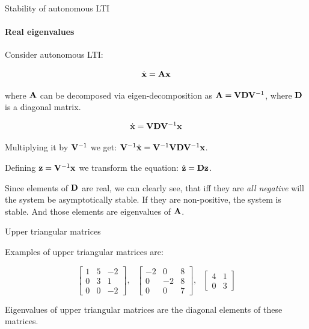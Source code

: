 \documentclass{beamer}
\begin{document}
\begin{frame}{Stability of autonomous LTI}
\framesubtitle{Real eigenvalues}
\begin{flushleft}

Consider autonomous LTI:

\begin{equation}
    \dot{\mathbf{x}} = \mathbf{A} \mathbf{x}
\end{equation}

where $\mathbf{A}$ can be decomposed via eigen-decomposition as $\mathbf{A} = \mathbf{V} \mathbf{D} \mathbf{V}^{-1}$, where $\mathbf{D}$ is a diagonal matrix. 

\bigskip

\begin{equation}
    \dot{\mathbf{x}} = \mathbf{V} \mathbf{D} \mathbf{V}^{-1} \mathbf{x}
\end{equation}

Multiplying it by $\mathbf{V}^{-1}$ 
we get: 
$\mathbf{V}^{-1} \dot{\mathbf{x}} = \mathbf{V}^{-1} \mathbf{V} \mathbf{D} \mathbf{V}^{-1} \mathbf{x}$.

Defining $\mathbf{z} = \mathbf{V}^{-1} \mathbf{x}$ we transform the equation: 
$\dot{\mathbf{z}} = \mathbf{D} \mathbf{z}$.

\bigskip

Since elements of $\mathbf{D}$ are real, we can clearly see, that iff they are \emph{all negative} will the system be asymptotically stable. If they are non-positive, the system is stable. And those elements are eigenvalues of $\mathbf{A}$.

\end{flushleft}
\end{frame}




\begin{frame}{Upper triangular matrices}
	\begin{flushleft}
		
		Examples of upper triangular matrices are:
		
		\begin{equation}
			\begin{bmatrix}
				1 & 5 & -2 \\
				0 & 3 & 1 \\
				0 & 0 & -2
			\end{bmatrix},
		\ \ \ 
		\begin{bmatrix}
			-2 & 0 & 8 \\
			0 & -2 & 8 \\
			0 & 0 & 7
		\end{bmatrix},
	\ \ \ 
		\begin{bmatrix}
			4 & 1 \\
			0 & 3
		\end{bmatrix}
		\end{equation}
		
		Eigenvalues of upper triangular matrices are the diagonal elements of these matrices.
		
	\end{flushleft}
\end{frame}
\end{document}

